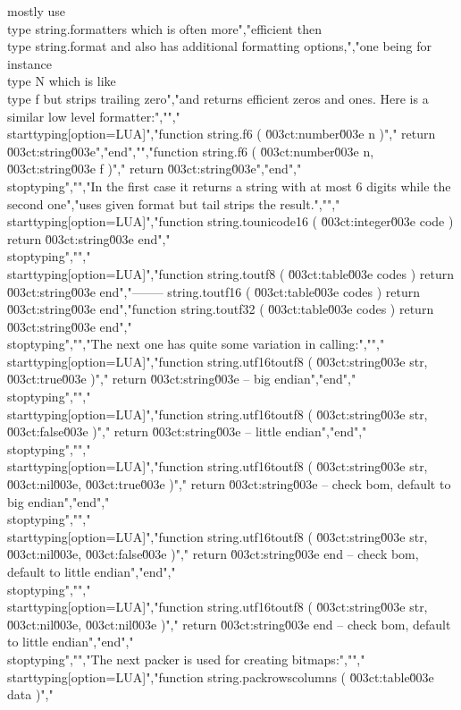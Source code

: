 mostly use \\type {string.formatters} which is often more","efficient then \\type {string.format} and also has additional formatting options,","one being for instance \\type {N} which is like \\type {f} but strips trailing zero","and returns efficient zeros and ones. Here is a similar low level formatter:","","\\starttyping[option=LUA]","function string.f6 ( \u003ct:number\u003e n )","    return \u003ct:string\u003e","end","","function string.f6 ( \u003ct:number\u003e n,  \u003ct:string\u003e f )","    return \u003ct:string\u003e","end","\\stoptyping","","In the first case it returns a string with at most 6 digits while the second one","uses given format but tail strips the result.","","\\starttyping[option=LUA]","function string.tounicode16 ( \u003ct:integer\u003e code  ) return \u003ct:string\u003e end","\\stoptyping","","\\starttyping[option=LUA]","function string.toutf8  ( \u003ct:table\u003e   codes ) return \u003ct:string\u003e end","-------- string.toutf16 ( \u003ct:table\u003e   codes ) return \u003ct:string\u003e end","function string.toutf32 ( \u003ct:table\u003e   codes ) return \u003ct:string\u003e end","\\stoptyping","","The next one has quite some variation in calling:","","\\starttyping[option=LUA]","function string.utf16toutf8 ( \u003ct:string\u003e str, \u003ct:true\u003e )","    return \u003ct:string\u003e  -- big endian","end","\\stoptyping","","\\starttyping[option=LUA]","function string.utf16toutf8 ( \u003ct:string\u003e str, \u003ct:false\u003e )","    return \u003ct:string\u003e -- little endian","end","\\stoptyping","","\\starttyping[option=LUA]","function string.utf16toutf8 ( \u003ct:string\u003e str, \u003ct:nil\u003e, \u003ct:true\u003e )","    return \u003ct:string\u003e -- check bom, default to big endian","end","\\stoptyping","","\\starttyping[option=LUA]","function string.utf16toutf8 ( \u003ct:string\u003e str, \u003ct:nil\u003e, \u003ct:false\u003e )","    return \u003ct:string\u003e end -- check bom, default to little endian","end","\\stoptyping","","\\starttyping[option=LUA]","function string.utf16toutf8 ( \u003ct:string\u003e str, \u003ct:nil\u003e, \u003ct:nil\u003e )","    return \u003ct:string\u003e end -- check bom, default to little endian","end","\\stoptyping","","The next packer is used for creating bitmaps:","","\\starttyping[option=LUA]","function string.packrowscolumns ( \u003ct:table\u003e data )","    